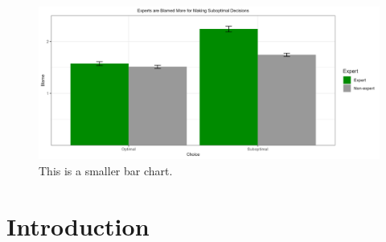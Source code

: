 \documentclass[
  man,floatsintext]{apa6}
\begin{document}
\begin{figure}
\includegraphics[width=6.67in]{blamebarchart} \caption{This is a smaller bar chart.}\label{fig:fig-resolutebar}
\end{figure}

\hypertarget{introduction}{%
\section{Introduction}\label{introduction}}
\end{document}
